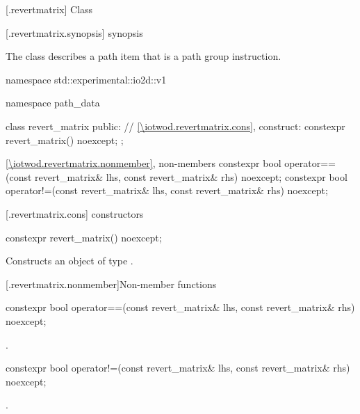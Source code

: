  [\iotwod.revertmatrix] {Class }

 [\iotwod.revertmatrix.synopsis] { synopsis}

\pnum
{}%
The class  describes a path item that is a path group instruction.

\begin{codeblock}
namespace std::experimental::io2d::v1 {
  namespace path_data {
    class revert_matrix {
    public:
      // \ref{\iotwod.revertmatrix.cons}, construct:
      constexpr revert_matrix() noexcept;
    };
    
    \ref{\iotwod.revertmatrix.nonmember}, non-members
    constexpr bool operator==(const revert_matrix& lhs,
      const revert_matrix& rhs) noexcept;
    constexpr bool operator!=(const revert_matrix& lhs,
      const revert_matrix& rhs) noexcept;
  }
}
\end{codeblock}

 [\iotwod.revertmatrix.cons] { constructors}

%
\begin{itemdecl}
constexpr revert_matrix() noexcept;
\end{itemdecl}
\begin{itemdescr}
\pnum
\effects
Constructs an object of type .
\end{itemdescr}

 [\iotwod.revertmatrix.nonmember]{Non-member functions}

%
\begin{itemdecl}
constexpr bool operator==(const revert_matrix& lhs, const revert_matrix& rhs) 
  noexcept;
\end{itemdecl}
\begin{itemdescr}
\pnum
\returns
{}.
\end{itemdescr}

%
\begin{itemdecl}
constexpr bool operator!=(const revert_matrix& lhs, const revert_matrix& rhs) 
  noexcept;
\end{itemdecl}
\begin{itemdescr}
\pnum
\returns
{}.
\end{itemdescr}

